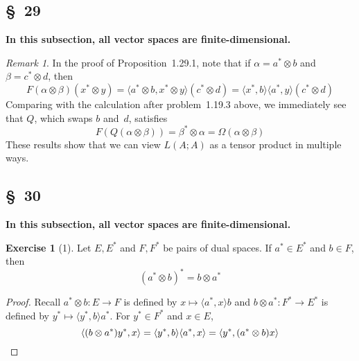 \documentclass[letterpaper,12pt]{article}
\newcommand{\tprod}{\otimes}
\newcommand{\sprod}[2]{\langle#1,#2\rangle}
\theoremstyle{definition}
\newtheorem*{exer}{Exercise}
\theoremstyle{remark}
\newtheorem*{rmk}{Remark}
\begin{document}
\subsection*{\S~29}
\textbf{In this subsection, all vector spaces are finite-dimensional.}

\begin{rmk}
In the proof of Proposition~1.29.1, note that if \(\alpha=a^*\tprod b\) and \(\beta=c^*\tprod d\), then
\[F(\alpha\tprod\beta)(x^*\tprod y)=\sprod{a^*\tprod b}{x^*\tprod y}(c^*\tprod d)=\sprod{x^*}{b}\sprod{a^*}{y}(c^*\tprod d)\]
Comparing with the calculation after problem~1.19.3 above, we immediately see that \(Q\), which swaps \(b\) and~\(d\), satisfies
\[F(Q(\alpha\tprod\beta))=\beta^*\tprod\alpha=\Omega(\alpha\tprod\beta)\]
These results show that we can view \(L(A;A)\) as a tensor product in multiple ways.
\end{rmk}

\subsection*{\S~30}
\textbf{In this subsection, all vector spaces are finite-dimensional.}

\begin{exer}[1]
Let \(E,E^*\) and \(F,F^*\) be pairs of dual spaces. If \(a^*\in E^*\) and \(b\in F\), then
\[(a^*\tprod b)^*=b\tprod a^*\]
\end{exer}
\begin{proof}
Recall \(a^*\tprod b:E\to F\) is defined by \(x\mapsto\sprod{a^*}{x}b\) and \(b\tprod a^*:F^*\to E^*\) is defined by \(y^*\mapsto\sprod{y^*}{b}a^*\). For \(y^*\in F^*\) and \(x\in E\),
\[\sprod{(b\tprod a^*)y^*}{x}=\sprod{y^*}{b}\sprod{a^*}{x}=\sprod{y^*}{(a^*\tprod b)x}\qedhere\]
\end{proof}
\end{document}
